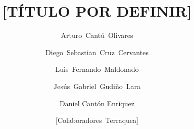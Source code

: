 \documentclass[runningheads]{llncs}
\begin{document}
\title{[T\'ITULO POR DEFINIR]}

\author{Arturo~Cant\'u~Olivares \and
Diego~Sebastian~Cruz~Cervantes \and
Luis~Fernando~Maldonado \and
Jes\'us~Gabriel~Gudi\~no~Lara \and
Daniel Cantón Enriquez \and
[Colaboradores~Terraquea]}



\maketitle
\end{document}
